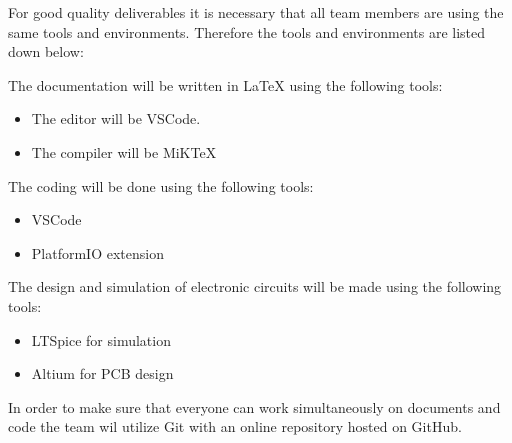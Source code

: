 For good quality deliverables it is necessary that all team members are using the same tools and environments. Therefore the tools and environments are listed down below:

The documentation will be written in LaTeX using the following tools:
\begin{itemize}
    \setlength\itemsep{-0.3em}
    \item The editor will be VSCode.
    \item The compiler will be MiKTeX
\end{itemize}

The coding will be done using the following tools:
\begin{itemize}
    \item VSCode
    \item PlatformIO extension
\end{itemize}

The design and simulation of electronic circuits will be made using the following tools:
\begin{itemize}
    \item LTSpice for simulation
    \item Altium for PCB design
\end{itemize}

In order to make sure that everyone can work simultaneously on documents and code the team wil utilize Git with an online repository hosted on GitHub.